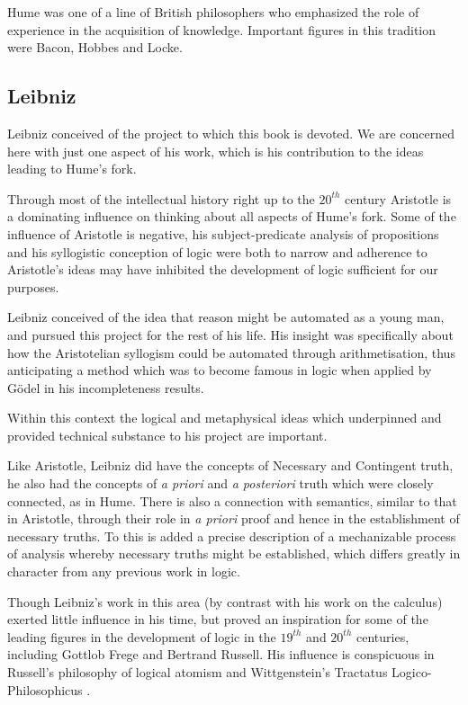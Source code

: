 Hume was one of a line of British philosophers who emphasized the role of experience in the acquisition of knowledge.
Important figures in this tradition were Bacon, Hobbes and Locke.

\subsection{Leibniz}

Leibniz conceived of the project to which this book is devoted.
We are concerned here with just one aspect of his work, which is his contribution to the ideas leading to Hume's fork.

Through most of the intellectual history right up to the $20^{th}$ century Aristotle is a dominating influence on thinking about all aspects of Hume's fork.
Some of the influence of Aristotle is negative, his subject-predicate analysis of propositions and his syllogistic conception of logic were both to narrow and adherence to Aristotle's ideas may have inhibited the development of logic sufficient for our purposes.

Leibniz conceived of the idea that reason might be automated as a young man, and pursued this project for the rest of his life.
His insight was specifically about how the Aristotelian syllogism could be automated through arithmetisation, thus anticipating a method which was to become famous in logic when applied by G\"odel in his incompleteness results.

Within this context the logical and metaphysical ideas which underpinned and provided technical substance to his project are important.

Like Aristotle, Leibniz did have the concepts of Necessary and Contingent truth, he also had the concepts of \emph{a priori} and \emph{a posteriori} truth which were closely connected, as in Hume.
There is also a connection with semantics, similar to that in Aristotle, through their role in \emph{a priori} proof and hence in the establishment of necessary truths.
To this is added a precise description of a mechanizable process of analysis whereby necessary truths might be established, which differs greatly in character from any previous work in logic.

Though Leibniz's work in this area (by contrast with his work on the calculus) exerted little influence in his time, but proved an inspiration for some of the leading figures in the development of logic in the $19^{th}$ and $20^{th}$ centuries, including Gottlob Frege and Bertrand Russell.
His influence is conspicuous in Russell's philosophy of logical atomism\cite{russellPLA} and Wittgenstein's Tractatus Logico-Philosophicus \cite{wittgenstein1921}.

